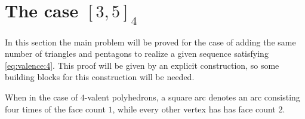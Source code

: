 \section{The case $[3, 5]_4$}
In this section the main problem will be proved for the case of adding the same number of triangles and pentagons to realize a given sequence satisfying \autoref{eq:valence:4}. This proof will be given by an explicit construction, so some building blocks for this construction will be needed.

\begin{definition}\label{def:square:arc}
  When in the case of $4$-valent polyhedrons, a square arc denotes an arc consisting four times of the face count $1$, while every other vertex has has face count $2$.
\end{definition}


